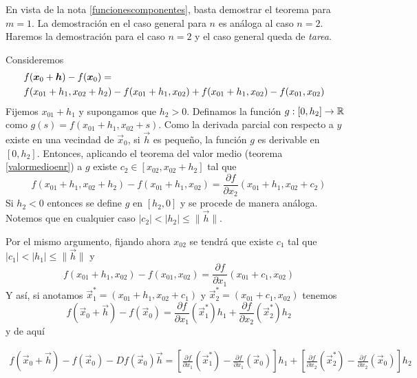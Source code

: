 \begin{demostracion}
En vista de la nota \ref{funcionescomponentes}, basta demostrar el
teorema para  $m=1$. La demostraci\'on en el caso general para $n$ es an\'aloga
al caso $n=2$. Haremos la demostraci\'on para el caso $n=2$ y el caso general queda de \emph{tarea}.

Consideremos
\begin{eqnarray*}
&f(\vec{x}_0+\vec{h})-f(\vec{x}_0)=\cr
&f(x_{01}+h_1,x_{02}+h_2)-f(x_{01}+h_1,x_{02})+
f(x_{01}+h_1,x_{02})-f(x_{01},x_{02})
\end{eqnarray*}
Fijemos $x_{01}+h_1$ y supongamos que $h_2> 0$. Definamos la funci\'on $g:[0,
h_2]\to \R$ como $g(s)=f(x_{01}+h_1,x_{02}+s)$. Como la derivada parcial con respecto a 
$y$ existe en una vecindad de $\vec{x}_0$, si $\vec{h}$ es peque\~no, la  funci\'on $g$
es derivable en $[0,
h_2]$. Entonces, aplicando el teorema del valor medio (teorema \ref{valormedioenr}) a $g$ existe
$c_2\in [x_{02},x_{02}+h_2]$ tal que
$$f(x_{01}+h_1,x_{02}+h_2)-f(x_{01}+h_1,x_{02})=
\frac{\partial f}{\partial x_2}(x_{01}+h_1,x_{02}+c_2)$$
Si $h_2< 0$ entonces se define $g$ en $[h_2,0]$ y se  procede de manera an\'aloga.
Notemos que en cualquier caso $|c_2|< |h_2|\le \|\vec{h}\|$.

Por el mismo argumento, fijando ahora $x_{02}$ se tendr\'a que existe
$c_1$ tal que $|c_1|< |h_1|\le \|\vec{h}\|$ y
$$f(x_{01}+h_1,x_{02})-f(x_{01},x_{02})=
\frac{\partial f}{\partial x_1}(x_{01}+c_1,x_{02})$$
Y as\'i, si anotamos $\vec{x}_1^*=(x_{01}+h_1,x_{02}+c_1)$ y $\vec{x}_2^*=(x_{01}+c_1,x_{02})$ tenemos
$$f(\vec{x}_0+\vec{h})-f(\vec{x}_0)= \frac{\partial f}{\partial x_1}(\vec{x}_1^*)h_1+\frac{\partial f}{\partial x_2}(\vec{x}_2^*)h_2$$
y de aqu\'i

\begin{gather}\label{tvm1}
f(\vec{x}_0+\vec{h})-f(\vec{x}_0)-Df(\vec{x}_0)\vec{h} = \left[\frac{\partial f}{\partial x_1}(\vec{x}_1^*)-
\frac{\partial f}{\partial x_1}(\vec{x}_0)\right]h_1+\left[\frac{\partial f}{\partial x_2}
(\vec{x}_2^*)-\frac{\partial f}{\partial x_2}(\vec{x}_0)\right]h_2 \tag{*}
\end{gather}


\end{demostracion}
